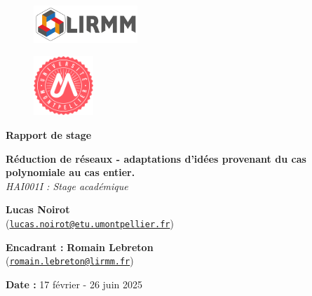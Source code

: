 \documentclass[a4paper,12pt]{report}  %
\theoremstyle{definitionstyle}
\theoremstyle{examplestyle}
\theoremstyle{remarkstyle}
\theoremstyle{propositionstyle}
\theoremstyle{theoremstyle}
\theoremstyle{proofstyle}
\begin{document}
	
	\begin{titlepage}
		\begin{center}
			\begin{figure}[t]
				\centering
				\includegraphics[width=0.35\textwidth]{logo/logo_LIRMM.jpg} 
			\end{figure}
			\begin{figure}[t]
				\centering
				\includegraphics[width=0.2\textwidth]{logo/logo_univ_mpt.png} 
			\end{figure}
			
			\vspace{2cm}
			\Large{\textbf{Rapport de stage}}
			
			\vspace{0.5cm}
				
				 \Large{\textbf{Réduction de réseaux - adaptations d'idées provenant du cas polynomiale au cas entier.}} \\
			\vspace{0.5cm}
			\large{\textit{HAI001I : Stage académique}} \\
			
			\vspace{2cm}
			
			\large{
				\textbf{Lucas Noirot} \\
				(\texttt{\href{mailto:lucas.noirot@etu.umontpellier.fr}{lucas.noirot@etu.umontpellier.fr}})
			}
			
			\vspace{1.5cm}
			
			\large{
				\textbf{Encadrant :} \textbf{Romain Lebreton} \\
				(\texttt{\href{mailto:romain.lebreton@lirmm.fr}{romain.lebreton@lirmm.fr}})
			}
			
			\vspace{2cm}
			
			\normalsize{
				\textbf{Date :}  17 février - 26 juin 2025
			}
		\end{center}
	\end{titlepage}
	
\end{document}
